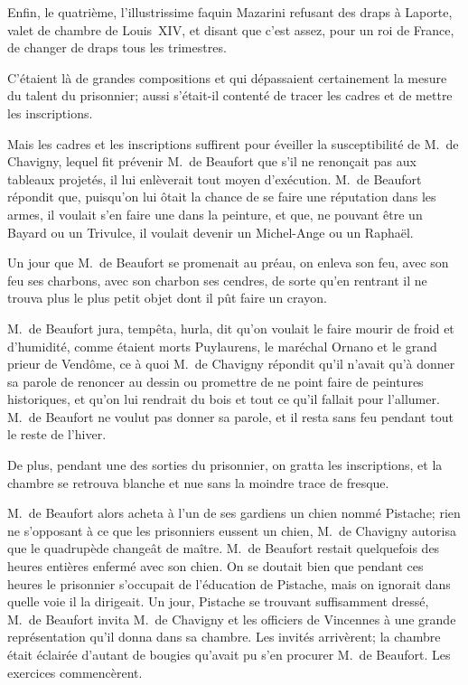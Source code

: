Enfin, le quatrième, l'illustrissime faquin Mazarini refusant des draps à Laporte, valet de chambre de Louis~XIV, et disant que c'est assez, pour un roi de France, de changer de draps tous les trimestres.

C'étaient là de grandes compositions et qui dépassaient certainement la mesure du talent du prisonnier; aussi s'était-il contenté de tracer les cadres et de mettre les inscriptions.

Mais les cadres et les inscriptions suffirent pour éveiller la susceptibilité de M.~de Chavigny, lequel fit prévenir M.~de Beaufort que s'il ne renonçait pas aux tableaux projetés, il lui enlèverait tout moyen d'exécution. M.~de Beaufort répondit que, puisqu'on lui ôtait la chance de se faire une réputation dans les armes, il voulait s'en faire une dans la peinture, et que, ne pouvant être un Bayard ou un Trivulce, il voulait devenir un Michel-Ange ou un Raphaël.

Un jour que M.~de Beaufort se promenait au préau, on enleva son feu, avec son feu ses charbons, avec son charbon ses cendres, de sorte qu'en rentrant il ne trouva plus le plus petit objet dont il pût faire un crayon.

M.~de Beaufort jura, tempêta, hurla, dit qu'on voulait le faire mourir de froid et d'humidité, comme étaient morts Puylaurens, le maréchal Ornano et le grand prieur de Vendôme, ce à quoi M.~de Chavigny répondit qu'il n'avait qu'à donner sa parole de renoncer au dessin ou promettre de ne point faire de peintures historiques, et qu'on lui rendrait du bois et tout ce qu'il fallait pour l'allumer. M.~de Beaufort ne voulut pas donner sa parole, et il resta sans feu pendant tout le reste de l'hiver.

De plus, pendant une des sorties du prisonnier, on gratta les inscriptions, et la chambre se retrouva blanche et nue sans la moindre trace de fresque.

M.~de Beaufort alors acheta à l'un de ses gardiens un chien nommé Pistache; rien ne s'opposant à ce que les prisonniers eussent un chien, M.~de Chavigny autorisa que le quadrupède changeât de maître. M.~de Beaufort restait quelquefois des heures entières enfermé avec son chien. On se doutait bien que pendant ces heures le prisonnier s'occupait de l'éducation de Pistache, mais on ignorait dans quelle voie il la dirigeait. Un jour, Pistache se trouvant suffisamment dressé, M.~de Beaufort invita M.~de Chavigny et les officiers de Vincennes à une grande représentation qu'il donna dans sa chambre. Les invités arrivèrent; la chambre était éclairée d'autant de bougies qu'avait pu s'en procurer M.~de Beaufort. Les exercices commencèrent.

